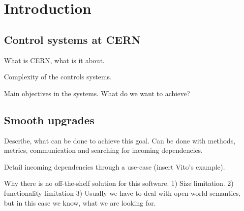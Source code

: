 \chapter{Introduction}


\section{Control systems at CERN}
What is CERN, what is it about.

Complexity of the controls systems.

Main objectives in the systems. What do we want to achieve? %

\section{Smooth upgrades}

Describe, what can be done to achieve this goal. Can be done with methods, metrics, communication and searching for incoming dependencies.
 
Detail incoming dependencies through a use-case (insert Vito's example).

Why there is no off-the-shelf solution for this software. 1) Size limitation. 2) functionality limitation 3) Usually we have to deal with open-world semantics, but in this case we know, what we are looking for.


